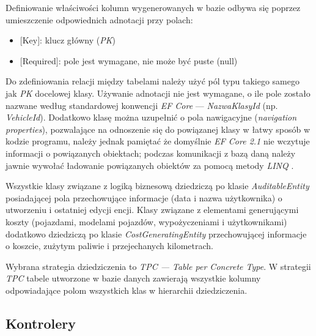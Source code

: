 \documentclass[eng,printmode,openany]{mgr}
\begin{document}
Definiowanie właściwości kolumn wygenerowanych w bazie odbywa się poprzez umieszczenie odpowiednich adnotacji przy polach:
\begin{itemize}
	\item $[$Key$]$: klucz główny (\textit{PK})
	\item $[$Required$]$: pole jest wymagane, nie może być puste (null)
\end{itemize}
Do zdefiniowania relacji między tabelami należy użyć pól typu takiego samego jak \textit{PK} docelowej klasy\cite{msdn-efcore-relationships}. Używanie adnotacji nie jest wymagane, o ile pole zostało nazwane według standardowej konwencji \textit{EF Core} — \textit{NazwaKlasyId} (np. \textit{VehicleId}). Dodatkowo klasę można uzupełnić o pola nawigacyjne (\textit{navigation properties}), pozwalające na odnoszenie się do powiązanej klasy w łatwy sposób w kodzie programu, należy jednak pamiętać że domyślnie \textit{EF Core 2.1} nie wczytuje informacji o powiązanych obiektach; podczas komunikacji z bazą daną należy jawnie wywołać ładowanie powiązanych obiektów za pomocą metody \textit{LINQ} .



\newpage 
Wszystkie klasy związane z logiką biznesową dziedziczą po klasie \textit{AuditableEntity} posiadającej pola przechowujące informacje (data i nazwa użytkownika) o utworzeniu i ostatniej edycji encji. Klasy związane z elementami generującymi koszty (pojazdami, modelami pojazdów, wypożyczeniami i użytkownikami) dodatkowo dziedziczą po klasie \textit{CostGeneratingEntity} przechowującej informacje o koszcie, zużytym paliwie i przejechanych kilometrach. 

Wybrana strategia dziedziczenia to \textit{TPC — Table per Concrete Type}. W strategii \textit{TPC} tabele utworzone w bazie danych zawierają wszystkie kolumny odpowiadające polom wszystkich klas w hierarchii dziedziczenia.





\subsection{Kontrolery}
\end{document}
